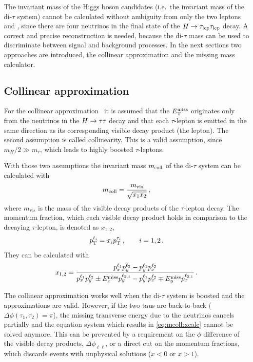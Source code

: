 The invariant mass of the Higgs boson candidates (i.e.\ the invariant mass of the di-$\tau$ system)
cannot be calculated without ambiguity from only the two leptons and \etmiss, since there are four neutrinos in the final state of the $H \to \tau_\text{lep} \tau_\text{lep}$ decay.
A correct and precise reconstruction is needed, because the di-$\tau$ mass can be used to discriminate between signal and background processes.
In the next sections two approaches are introduced, the collinear approximation and the missing mass calculator.

\subsection{Collinear approximation}\label{sub:event_selection:mcoll}

For the collinear approximation~\cite{MCollAssumption,MColl} it is assumed that the $E_\text{T}^\text{miss}$ originates only
from the neutrinos in the $H \to \tau \tau$ decay and that each $\tau$-lepton is emitted in the same direction as its corresponding visible decay
product (the lepton).
The second assumption is called collinearity.
This is a valid assumption, since $m_H / 2 \gg m_\tau$, which leads to highly boosted $\tau$-leptons.

With those two assumptions the invariant mass $m_\text{coll}$ of the di-$\tau$ system can be calculated with
\begin{equation}
    \label{eq:mcoll}
    m_\text{coll} = \frac{m_\text{vis}}{\sqrt{x_1 x_2}} \,,
\end{equation}
where $m_\text{vis}$ is the mass of the visible decay products of the $\tau$-lepton decay.
The momentum fraction, which each visible decay product holds in comparison to the decaying $\tau$-lepton,
is denoted as $x_{1,2}$,
\begin{equation}
    \label{eq:mcoll:xdef}
    p_\text{T}^{\ell_i} = x_i p_\text{T}^{\tau_i} \,, \qquad i = 1,2 \,.
\end{equation}
They can be calculated with
\begin{equation}
    \label{eq:mcoll:xcalc}
    x_{1,2} = \frac{p_x^{\ell_1} p_y^{\ell_2} - p_y^{\ell_1} p_x^{\ell_2}}{p_x^{\ell_1} p_y^{\ell_2} \pm E_x^\text{miss} p_y^{\ell_{2,1}} - p_y^{\ell_1} p_x^{\ell_2} \mp E_y^\text{miss} p_x^{\ell_{2,1}}} \,.
\end{equation}

The collinear approximation works well when the di-$\tau$ system is boosted and the approximations are valid.
However, if the two taus are back-to-back ($\Delta \phi (\tau_1,\tau_2) = \pi$), the missing transverse energy
due to the neutrinos cancels partially and the equation system which results in \cref{eq:mcoll:xcalc} cannot
be solved anymore.
This can be prevented by a requirement on the $\phi$ difference of the visible decay products, $\Delta \phi_{\ell\ell}$, or a direct
cut on the momentum fractions, which discards events with unphysical solutions ($x < 0$ or $x > 1$).

